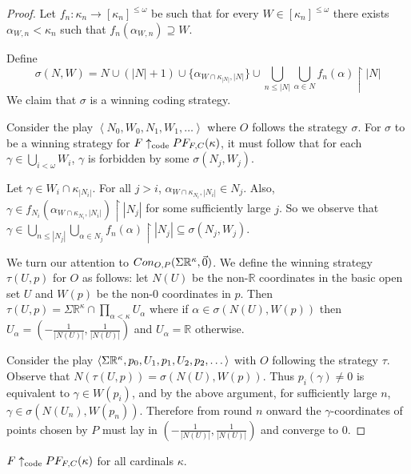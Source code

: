 \begin{proof}
Let $f_n:\kappa_n\to[\kappa_n]^{\leq\omega}$ be such that for every $W\in[\kappa_n]^{\leq\omega}$ there exists $\alpha_{W,n}<\kappa_n$ such that $f_n(\alpha_{W,n})\supseteq W$.

Define \[\sigma(N,W)=N\cup(|N|+1)\cup\{\alpha_{W\cap \kappa_{|N|},|N|}\}\cup\bigcup_{n\leq|N|}\bigcup_{\alpha\in N} f_n(\alpha)\restriction |N|\] We claim that $\sigma$ is a winning coding strategy.

Consider the play $\left<N_0,W_0,N_1,W_1,\dots\right>$ where $O$ follows the strategy $\sigma$. For $\sigma$ to be a winning strategy for $F \uparrow_{\text{code}} PF_{F,C}(\kappa)$, it must follow that for each $\gamma\in\bigcup_{i<\omega}W_i$, $\gamma$ is forbidden by some $\sigma(N_j,W_j)$. 

Let $\gamma\in W_i\cap \kappa_{|N_i|}$. For all $j>i$, $\alpha_{W\cap\kappa_{N_i},|N_i|}\in N_j$. Also, $\gamma \in f_{N_i}(\alpha_{W\cap\kappa_{N_i},|N_i|})\restriction|N_j|$ for some sufficiently large $j$. So we observe that $\gamma \in \bigcup_{n\leq|N_j|}\bigcup_{\alpha\in N_j} f_n(\alpha)\restriction |N_j|\subseteq \sigma(N_j,W_j)$.

We turn our attention to $Con_{O,P}(\Sigma\mathbb{R}^{\kappa},\vec{0})$. We define the winning strategy $\tau(U,p)$ for $O$ as follows: let $N(U)$ be the non-$\mathbb{R}$ coordinates in the basic open set $U$ and $W(p)$ be the non-$0$ coordinates in $p$. Then $\tau(U,p) =\Sigma\mathbb{R}^\kappa \cap \prod_{\alpha<\kappa} U_\alpha$ where if $\alpha \in \sigma(N(U),W(p))$ then $U_\alpha = (-\frac{1}{|N(U)|},\frac{1}{|N(U)|})$ and $U_\alpha=\mathbb{R}$ otherwise.

Consider the play $\left<\Sigma\mathbb{R}^{\kappa},p_0,U_1,p_1,U_2,p_2,\dots\right>$ with $O$ following the strategy $\tau$. Observe that $N(\tau(U,p))=\sigma(N(U),W(p))$. Thus $p_i(\gamma)\not=0$ is equivalent to $\gamma \in W(p_i)$, and by the above argument, for sufficiently large $n$, $\gamma \in \sigma(N(U_n),W(p_n))$. Therefore from round $n$ onward the $\gamma$-coordinates of points chosen by $P$ must lay in $(-\frac{1}{|N(U)|},\frac{1}{|N(U)|})$ and converge to $0$.
\end{proof}

\begin{theorem}
$F\uparrow_{\text{code}}PF_{F,C}(\kappa)$ for all cardinals $\kappa$.
\end{theorem}

